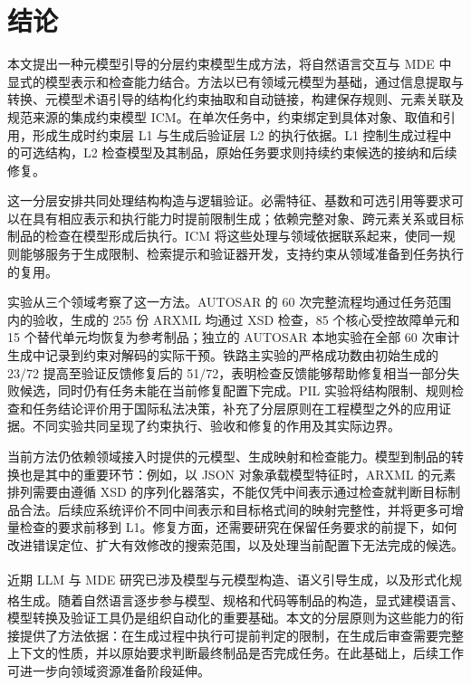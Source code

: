 \documentclass[pdflatex,iicol,sn-mathphys-num]{sn-jnl}
\newcommand{\paperref}[1]{\textsuperscript{\textcolor{citationred}{\citep{#1}}}}
\begin{document}
\section{结论}\label{sec:conclusion}

本文提出一种元模型引导的分层约束模型生成方法，将自然语言交互与 MDE 中显式的模型表示和检查能力结合。方法以已有领域元模型为基础，通过信息提取与转换、元模型术语引导的结构化约束抽取和自动链接，构建保存规则、元素关联及规范来源的集成约束模型 ICM。在单次任务中，约束绑定到具体对象、取值和引用，形成生成时约束层 L1 与生成后验证层 L2 的执行依据。L1 控制生成过程中的可选结构，L2 检查模型及其制品，原始任务要求则持续约束候选的接纳和后续修复。


这一分层安排共同处理结构构造与逻辑验证。必需特征、基数和可选引用等要求可以在具有相应表示和执行能力时提前限制生成；依赖完整对象、跨元素关系或目标制品的检查在模型形成后执行。ICM 将这些处理与领域依据联系起来，使同一规则能够服务于生成限制、检索提示和验证器开发，支持约束从领域准备到任务执行的复用。


实验从三个领域考察了这一方法。AUTOSAR 的 60 次完整流程均通过任务范围内的验收，生成的 255 份 ARXML 均通过 XSD 检查，85 个核心受控故障单元和 15 个替代单元均恢复为参考制品；独立的 AUTOSAR 本地实验在全部 60 次审计生成中记录到约束对解码的实际干预。铁路主实验的严格成功数由初始生成的 23/72 提高至验证反馈修复后的 51/72，表明检查反馈能够帮助修复相当一部分失败候选，同时仍有任务未能在当前修复配置下完成。PIL 实验将结构限制、规则检查和任务结论评价用于国际私法决策，补充了分层原则在工程模型之外的应用证据。不同实验共同呈现了约束执行、验收和修复的作用及其实际边界。


当前方法仍依赖领域接入时提供的元模型、生成映射和检查能力。模型到制品的转换也是其中的重要环节：例如，以 JSON 对象承载模型特征时，ARXML 的元素排列需要由遵循 XSD 的序列化器落实，不能仅凭中间表示通过检查就判断目标制品合法。后续应系统评价不同中间表示和目标格式间的映射完整性，并将更多可增量检查的要求前移到 L1。修复方面，还需要研究在保留任务要求的前提下，如何改进错误定位、扩大有效修改的搜索范围，以及处理当前配置下无法完成的候选。


近期 LLM 与 MDE 研究已涉及模型与元模型构造\paperref{JOT:issue_2026_03/a8}、语义引导生成\paperref{Chen_2026}，以及形式化规格生成\paperref{Ma_2025b}。随着自然语言逐步参与模型、规格和代码等制品的构造，显式建模语言、模型转换及验证工具仍是组织自动化的重要基础。本文的分层原则为这些能力的衔接提供了方法依据：在生成过程中执行可提前判定的限制，在生成后审查需要完整上下文的性质，并以原始要求判断最终制品是否完成任务。在此基础上，后续工作可进一步向领域资源准备阶段延伸。
\end{document}

